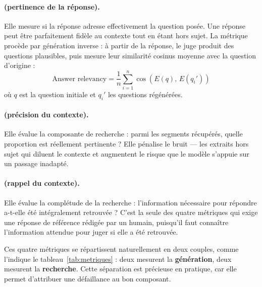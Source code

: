 \paragraph{ (pertinence de la réponse).}
Elle mesure si la réponse adresse effectivement la question posée. Une réponse
peut être parfaitement fidèle au contexte tout en étant hors sujet. La métrique
procède par génération inverse : à partir de la réponse, le juge produit des
questions plausibles, puis mesure leur similarité cosinus moyenne avec la
question d'origine :
\[
  \text{Answer relevancy} =
  \frac{1}{n}\sum_{i=1}^{n}\cos\!\left(E(q),\, E(q_i')\right)
\]
où $q$ est la question initiale et $q_i'$ les questions régénérées.

\paragraph{ (précision du contexte).}
Elle évalue la composante de recherche : parmi les segments récupérés, quelle
proportion est réellement pertinente ? Elle pénalise le bruit --- les extraits
hors sujet qui diluent le contexte et augmentent le risque que le modèle
s'appuie sur un passage inadapté.

\paragraph{ (rappel du contexte).}
Elle évalue la complétude de la recherche : l'information nécessaire pour
répondre a-t-elle été intégralement retrouvée ? C'est la seule des quatre
métriques qui exige une réponse de référence rédigée par un humain, puisqu'il
faut connaître l'information attendue pour juger si elle a été retrouvée.

\vspace{0.3cm}

Ces quatre métriques se répartissent naturellement en deux couples, comme
l'indique le tableau~\ref{tab:metriques} : deux mesurent la
\textbf{génération}, deux mesurent la \textbf{recherche}. Cette séparation est
précieuse en pratique, car elle permet d'attribuer une défaillance au bon
composant.

